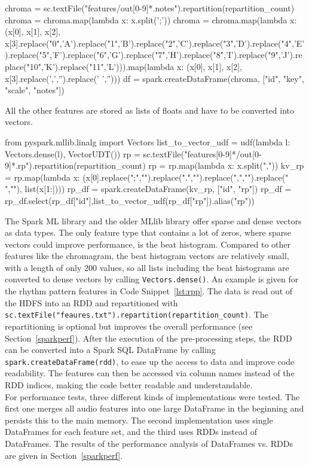 \begin{pythonCode}[frame=single,label={lst:prep1},caption={Notes preprocessing},captionpos=b]
chroma = sc.textFile("features/out[0-9]*.notes").repartition(repartition_count)
chroma = chroma.map(lambda x: x.split(';'))
chroma = chroma.map(lambda x: (x[0], x[1], x[2], x[3].replace("0",'A').replace("1",'B').replace("2",'C').replace("3",'D').replace("4",'E').replace("5",'F').replace("6",'G').replace("7",'H').replace("8",'I').replace("9",'J').replace("10",'K').replace("11",'L'))).map(lambda x: (x[0], x[1], x[2], x[3].replace(',','').replace(' ','')))
df = spark.createDataFrame(chroma, ["id", "key", "scale", "notes"])
\end{pythonCode}

\noindent All the other features are stored as lists of floats and have to be converted into vectors. 

\begin{pythonCode}[frame=single,label={lst:rpp},caption={Rhythm patterns preprocessing},captionpos=b]
from pyspark.mllib.linalg import Vectors
list_to_vector_udf = udf(lambda l: Vectors.dense(l), VectorUDT())
rp = sc.textFile("features[0-9]*/out[0-9]*.rp").repartition(repartition_count)
rp = rp.map(lambda x: x.split(","))
kv_rp = rp.map(lambda x: (x[0].replace(";","").replace(".","").replace(",","").replace(" ",""), list(x[1:])))
rp_df = spark.createDataFrame(kv_rp, ["id", "rp"])
rp_df = rp_df.select(rp_df["id"],list_to_vector_udf(rp_df["rp"]).alias("rp"))
\end{pythonCode}

\noindent The Spark ML library and the older MLlib library offer sparse and dense vectors as data types. The only feature type that contains a lot of zeros, where sparse vectors could improve performance, is the beat histogram. Compared to other features like the chromagram, the beat histogram vectors are relatively small, with a length of only 200 values, so all lists including the beat histograms are converted to dense vectors by calling \lstinline{Vectors.dense()}. 
\noindent An example is given for the rhythm pattern features in Code Snippet~\ref{lst:rpp}. The data is read out of the HDFS into an RDD and repartitioned with \lstinline{sc.textFile("feaures.txt").repartition(repartition_count)}. The repartitioning is optional but improves the overall performance (see Section~\ref{sparkperf}). After the execution of the pre-processing steps, the RDD can be converted into a Spark SQL DataFrame by calling \lstinline{spark.createDataFrame(rdd)}, to ease up the access to data and improve code readability. The features can then be accessed via column names instead of the RDD indices, making the code better readable and understandable.\\
For performance tests, three different kinds of implementations were tested. The first one merges all audio features into one large DataFrame in the beginning and persists this to the main memory. The second implementation uses single DataFrames for each feature set, and the third uses RDDs instead of DataFrames. The results of the performance analysis of DataFrames vs. RDDs are given in Section~\ref{sparkperf}.

